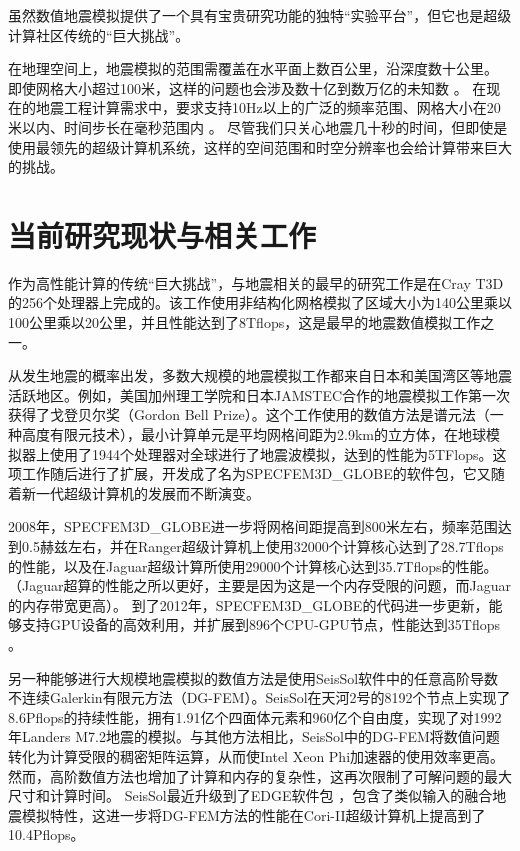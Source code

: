 \documentclass[degree=doctor]{thuthesis}
\begin{document}
虽然数值地震模拟提供了一个具有宝贵研究功能的独特“实验平台”，但它也是超级计算社区传统的“巨大挑战”。

在地理空间上，地震模拟的范围需覆盖在水平面上数百公里，沿深度数十公里。 即使网格大小超过100米，这样的问题也会涉及数十亿到数万亿的未知数 \citep{cui2010scalable}。 在现在的地震工程计算需求中，要求支持10Hz以上的广泛的频率范围、网格大小在20米以内、时间步长在毫秒范围内  \citep{cui2013physics}。 尽管我们只关心地震几十秒的时间，但即使是使用最领先的超级计算机系统，这样的空间范围和时空分辨率也会给计算带来巨大的挑战。

\section{当前研究现状与相关工作}

作为高性能计算的传统“巨大挑战”，与地震相关的最早的研究工作是在Cray T3D \citep {bao1996earthquake}的256个处理器上完成的。该工作使用非结构化网格模拟了区域大小为140公里乘以100公里乘以20公里，并且性能达到了8Tflops，这是最早的地震数值模拟工作之一。

从发生地震的概率出发，多数大规模的地震模拟工作都来自日本和美国湾区等地震活跃地区。例如，美国加州理工学院和日本JAMSTEC\citep {es-gb-2003}合作的地震模拟工作第一次获得了戈登贝尔奖（Gordon Bell Prize）。这个工作使用的数值方法是谱元法（一种高度有限元技术），最小计算单元是平均网格间距为2.9km的立方体，在地球模拟器上使用了1944个处理器对全球进行了地震波模拟，达到的性能为5TFlops。这项工作随后进行了扩展，开发成了名为SPECFEM3D\_GLOBE的软件包，它又随着新一代超级计算机的发展而不断演变。

2008年，SPECFEM3D\_GLOBE进一步将网格间距提高到800米左右，频率范围达到0.5赫兹左右，并在Ranger超级计算机上使用32000个计算核心达到了28.7Tflops的性能，以及在Jaguar超级计算所使用29000个计算核心达到35.7Tflops的性能。（Jaguar超算的性能之所以更好，主要是因为这是一个内存受限的问题，而Jaguar的内存带宽更高）。 到了2012年，SPECFEM3D\_GLOBE的代码进一步更新，能够支持GPU设备的高效利用，并扩展到896个CPU-GPU节点，性能达到35Tflops \citep {rietmann2012forward}。

另一种能够进行大规模地震模拟的数值方法是使用SeisSol软件中的任意高阶导数不连续Galerkin有限元方法（DG-FEM）。SeisSol在天河2号的8192个节点上实现了8.6Pflops的持续性能\citep{tianhe2-2014gb}，拥有1.91亿个四面体元素和960亿个自由度，实现了对1992年Landers M7.2地震的模拟。与其他方法相比，SeisSol中的DG-FEM将数值问题转化为计算受限的稠密矩阵运算，从而使Intel Xeon Phi加速器的使用效率更高。然而，高阶数值方法也增加了计算和内存的复杂性，这再次限制了可解问题的最大尺寸和计算时间。 SeisSol最近升级到了EDGE软件包 \citep {breuer2017edge}，包含了类似输入的融合地震模拟特性，这进一步将DG-FEM方法的性能在Cori-II超级计算机上提高到了10.4Pflops。
\end{document}
